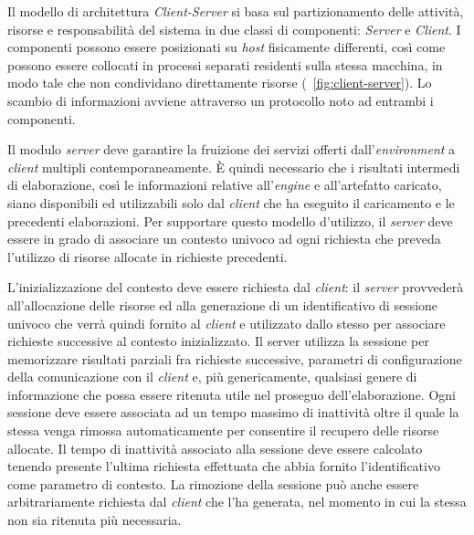 Il modello di architettura \emph{Client-Server} si basa sul partizionamento delle attività, risorse e responsabilità del sistema in due classi di componenti: \emph{Server} e \emph{Client}.
I componenti possono essere posizionati su \emph{host} fisicamente differenti, così come possono essere collocati in processi separati residenti sulla stessa macchina, in modo tale che non condividano direttamente risorse (\figurename~\ref{fig:client-server}). Lo scambio di informazioni avviene attraverso un protocollo noto ad entrambi i componenti.

Il modulo \emph{server} deve garantire la fruizione dei servizi offerti dall'\emph{en\-vi\-ron\-ment} a \emph{client} multipli contemporaneamente. \`E quindi necessario che i risultati intermedi di elaborazione, così le informazioni relative all'\emph{engine} e all'artefatto caricato, siano disponibili ed utilizzabili solo dal \emph{client} che ha eseguito il caricamento e le precedenti elaborazioni. Per supportare questo modello d'utilizzo, il \emph{server} deve essere in grado di associare un contesto univoco ad ogni richiesta che preveda l'utilizzo di risorse allocate in richieste precedenti.

L'inizializzazione del contesto deve essere richiesta dal \emph{client}: il \emph{server} provvederà all'allocazione delle risorse ed alla generazione di un identificativo di sessione univoco che verrà quindi fornito al \emph{client} e utilizzato dallo stesso per associare richieste successive al contesto inizializzato. Il server utilizza la sessione per memorizzare risultati parziali fra richieste successive, parametri di configurazione della comunicazione con il \emph{client} e, più genericamente, qualsiasi genere di informazione che possa essere ritenuta utile nel proseguo dell'elaborazione. Ogni sessione deve essere associata ad un tempo massimo di inattività oltre il quale la stessa venga rimossa automaticamente per consentire il recupero delle risorse allocate. Il tempo di inattività associato alla sessione deve essere calcolato tenendo presente l'ultima richiesta effettuata che abbia fornito l'identificativo come parametro di contesto. La rimozione della sessione può anche essere arbitrariamente richiesta dal \emph{client} che l'ha generata, nel momento in cui la stessa non sia ritenuta più necessaria.




